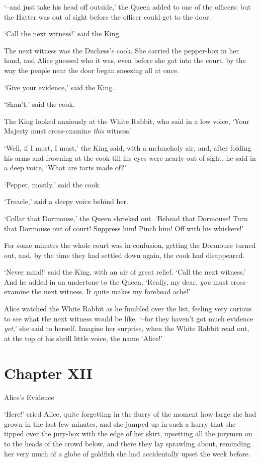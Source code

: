   `--and just take his head off outside,' the Queen added to one
of the officers:  but the Hatter was out of sight before the
officer could get to the door.

  `Call the next witness!' said the King.

  The next witness was the Duchess's cook.  She carried the
pepper-box in her hand, and Alice guessed who it was, even before
she got into the court, by the way the people near the door began
sneezing all at once.

  `Give your evidence,' said the King.

  `Shan't,' said the cook.

  The King looked anxiously at the White Rabbit, who said in a
low voice, `Your Majesty must cross-examine {\it this} witness.'

  `Well, if I must, I must,' the King said, with a melancholy
air, and, after folding his arms and frowning at the cook till
his eyes were nearly out of sight, he said in a deep voice, `What
are tarts made of?'

  `Pepper, mostly,' said the cook.

  `Treacle,' said a sleepy voice behind her.

  `Collar that Dormouse,' the Queen shrieked out.  `Behead that
Dormouse!  Turn that Dormouse out of court!  Suppress him!  Pinch
him!  Off with his whiskers!'

  For some minutes the whole court was in confusion, getting the
Dormouse turned out, and, by the time they had settled down
again, the cook had disappeared.

  `Never mind!' said the King, with an air of great relief.
`Call the next witness.'  And he added in an undertone to the
Queen, `Really, my dear, {\it you} must cross-examine the next witness.
It quite makes my forehead ache!'

  Alice watched the White Rabbit as he fumbled over the list,
feeling very curious to see what the next witness would be like,
`--for they haven't got much evidence {\it yet},' she said to herself.
Imagine her surprise, when the White Rabbit read out, at the top
of his shrill little voice, the name `Alice!'



\chapter{Chapter XII}{Alice's Evidence}


  `Here!' cried Alice, quite forgetting in the flurry of the
moment how large she had grown in the last few minutes, and she
jumped up in such a hurry that she tipped over the jury-box with
the edge of her skirt, upsetting all the jurymen on to the heads
of the crowd below, and there they lay sprawling about, reminding
her very much of a globe of goldfish she had accidentally upset
the week before.

